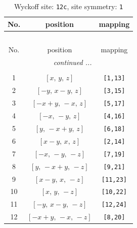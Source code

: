 \documentclass[fleqn,8pt]{jsarticle}
\begin{document}
\begin{longtable}{ccc}
\caption{Wyckoff site: {\tt 12c}, site symmetry: {\tt 1}}
 \\
 \hline \hline
No. & position & mapping \\ \hline \endfirsthead

\multicolumn{2}{l}{\tablename\ \thetable{}} \\
 \hline \hline
No. & position & mapping \\ \hline \endhead

 \hline \hline
\multicolumn{2}{r}{\footnotesize\it continued ...} \\ \endfoot

 \hline \hline
\multicolumn{2}{r}{} \\ \endlastfoot

1 & $\left[ x,\, y,\, z \right]$ & {\tt [1,13]} \\ \hline
2 & $\left[ - y,\, x - y,\, z \right]$ & {\tt [3,15]} \\ \hline
3 & $\left[ - x + y,\, - x,\, z \right]$ & {\tt [5,17]} \\ \hline
4 & $\left[ - x,\, - y,\, z \right]$ & {\tt [4,16]} \\ \hline
5 & $\left[ y,\, - x + y,\, z \right]$ & {\tt [6,18]} \\ \hline
6 & $\left[ x - y,\, x,\, z \right]$ & {\tt [2,14]} \\ \hline
7 & $\left[ - x,\, - y,\, - z \right]$ & {\tt [7,19]} \\ \hline
8 & $\left[ y,\, - x + y,\, - z \right]$ & {\tt [9,21]} \\ \hline
9 & $\left[ x - y,\, x,\, - z \right]$ & {\tt [11,23]} \\ \hline
10 & $\left[ x,\, y,\, - z \right]$ & {\tt [10,22]} \\ \hline
11 & $\left[ - y,\, x - y,\, - z \right]$ & {\tt [12,24]} \\ \hline
12 & $\left[ - x + y,\, - x,\, - z \right]$ & {\tt [8,20]} \\
\end{longtable}
\end{document}
